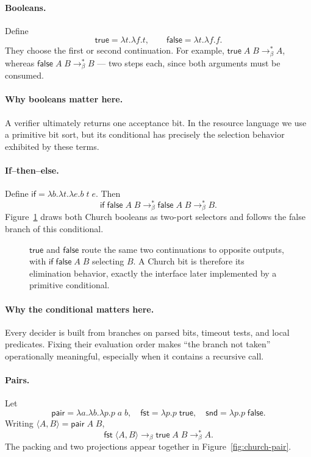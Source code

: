 \paragraph{Booleans.}
Define
\[
 \mathsf{true}=\lambda t.\lambda f.t,
 \qquad \mathsf{false}=\lambda t.\lambda f.f.
\]
They choose the first or second continuation.  For example,
\(\mathsf{true}\;A\;B\to_\beta^*A\), whereas
\(\mathsf{false}\;A\;B\to_\beta^*B\) --- two steps each, since both arguments
must be consumed.

\paragraph{Why booleans matter here.}
A verifier ultimately returns one acceptance bit.  In the resource language
we use a primitive bit sort, but its conditional has precisely the selection
behavior exhibited by these terms.

\paragraph{If--then--else.}
Define
\(\mathsf{if}=\lambda b.\lambda t.\lambda e.b\;t\;e\).  Then
\[
 \mathsf{if}\;\mathsf{false}\;A\;B
 \to_\beta^*\mathsf{false}\;A\;B
 \to_\beta^*B.
\]
Figure~\ref{fig:church-bool-if} draws both Church booleans as two-port
selectors and follows the false branch of this conditional.

\begin{figure}[ht]
\centering

\caption{$\mathsf{true}$ and $\mathsf{false}$ route the same two continuations to opposite outputs, with $\mathsf{if}\;\mathsf{false}\;A\;B$ selecting $B$.  A Church bit is therefore its elimination behavior, exactly the interface later implemented by a primitive conditional.}
\label{fig:church-bool-if}
\end{figure}

\paragraph{Why the conditional matters here.}
Every decider is built from branches on parsed bits, timeout tests, and local
predicates.  Fixing their evaluation order makes ``the branch not taken''
operationally meaningful, especially when it contains a recursive call.

\paragraph{Pairs.}
Let
\[
 \mathsf{pair}=\lambda a.\lambda b.\lambda p.p\;a\;b,
 \quad \mathsf{fst}=\lambda p.p\;\mathsf{true},
 \quad \mathsf{snd}=\lambda p.p\;\mathsf{false}.
\]
Writing \(\langle A,B\rangle=\mathsf{pair}\;A\;B\),
\[
 \mathsf{fst}\;\langle A,B\rangle
 \to_\beta\mathsf{true}\;A\;B\to_\beta^*A.
\]
The packing and two projections appear together in
Figure~\ref{fig:church-pair}.

